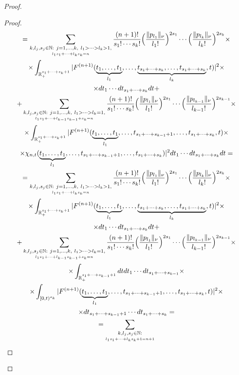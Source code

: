 \begin{proof}
\begin{proof}
\begin{gather*}
=\sum_{\underset{l_1s_1+\cdots+l_ks_k=n}{k,l_j,s_j\in\mathbb{N}:
\ j=1,\dots,k,\ l_1>\cdots>l_k>1,}}
\frac{(n+1)!}{s_1!\cdots s_k!}
\Big(\frac{\|p_{l_1}\|_\nu}{l_1!}\Big)^{2s_1}
\cdots\Big(\frac{\|p_{l_k}\|_\nu}{l_k!}\Big)^{2s_k}\times\\
\times\int_{\mathbb{R}_+^{s_1+\cdots+s_k+1}}|F^{(n+1)}(
\underset{l_1}{\underbrace{t_1,\dots,t_1}},\dots,
\underset{l_k}{\underbrace{t_{s_1+\cdots+s_k},\dots,
t_{s_1+\cdots+s_k}}},t)|^2\times\\
\times dt_1\cdots dt_{s_1+\cdots+s_k}dt+\\
+\sum_{\underset{l_1s_1+\cdots+l_{k-1}s_{k-1}+s_k=n}{k,l_j,s_j\in\mathbb{N}:
\ j=1,\dots,k,\ l_1>\cdots>l_k=1,}}
\frac{(n+1)!}{s_1!\cdots s_k!}
\Big(\frac{\|p_{l_1}\|_\nu}{l_1!}\Big)^{2s_1}
\cdots\Big(\frac{\|p_{l_{k-1}}\|_\nu}{l_{k-1}!}\Big)^{2s_{k-1}}\times\\
\times\int_{\mathbb{R}_+^{s_1+\cdots+s_k+1}}|F^{(n+1)}(
\underset{l_1}{\underbrace{t_1,\dots,t_1}},\dots,
t_{s_1+\cdots+s_{k-1}+1},\dots,t_{s_1+\cdots+s_k},t)\times\\
\times\chi_{n,t}(\underset{l_1}{\underbrace{t_1,\dots,t_1}},\dots,
t_{s_1+\cdots+s_{k-1}+1},\dots,t_{s_1+\cdots+s_k})|^2
dt_1\cdots dt_{s_1+\cdots+s_k}dt=\\
=\sum_{\underset{l_1s_1+\cdots+l_ks_k=n}{k,l_j,s_j\in\mathbb{N}:
\ j=1,\dots,k,\ l_1>\cdots>l_k>1,}}
\frac{(n+1)!}{s_1!\cdots s_k!}
\Big(\frac{\|p_{l_1}\|_\nu}{l_1!}\Big)^{2s_1}
\cdots\Big(\frac{\|p_{l_k}\|_\nu}{l_k!}\Big)^{2s_k}\times\\
\times\int_{\mathbb{R}_+^{s_1+\cdots+s_k+1}}|F^{(n+1)}(
\underset{l_1}{\underbrace{t_1,\dots,t_1}},\dots,
\underset{l_k}{\underbrace{t_{s_1+\cdots+s_k},\dots,
t_{s_1+\cdots+s_k}}},t)|^2\times\\
\times dt_1\cdots dt_{s_1+\cdots+s_k}dt+\\
+\sum_{\underset{l_1s_1+\cdots+l_{k-1}s_{k-1}+s_k=n}{k,l_j,s_j\in\mathbb{N}:
\ j=1,\dots,k,\ l_1>\cdots>l_k=1,}}
\frac{(n+1)!}{s_1!\cdots s_k!}
\Big(\frac{\|p_{l_1}\|_\nu}{l_1!}\Big)^{2s_1}
\cdots\Big(\frac{\|p_{l_{k-1}}\|_\nu}{l_{k-1}!}\Big)^{2s_{k-1}}\times\\
\times\int_{\mathbb{R}_+^{s_1+\cdots+s_{k-1}+1}}
dtdt_1\cdots dt_{s_1+\cdots+s_{k-1}}\times\\
\times\int_{[0,t)^{s_k}}|F^{(n+1)}(
\underset{l_1}{\underbrace{t_1,\dots,t_1}},\dots,
t_{s_1+\cdots+s_{k-1}+1},\dots,t_{s_1+\cdots+s_k},t)|^2\times\\
\times dt_{s_1+\cdots+s_{k-1}+1}\cdots dt_{s_1+\dots+s_k}=\\
=\sum_{\underset{l_1s_1+\cdots+l_ks_k+1=n+1}{k,l_j,s_j\in\mathbb{N}:
}}
\end{gather*}
\end{proof}
\end{proof}
